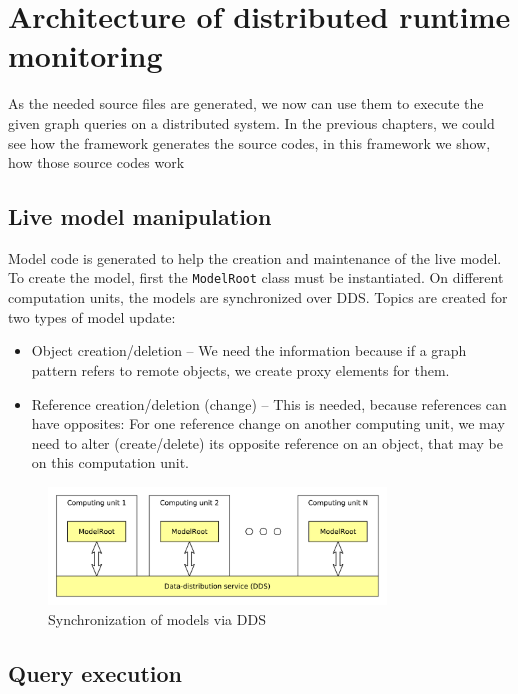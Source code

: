 %
\chapter{Architecture of distributed runtime monitoring}
%

As the needed source files are generated, we now can use them to execute the given graph queries on a distributed system. 
In the previous chapters, we could see how the framework generates the source codes, in this framework we show, how those source codes work



\section{Live model manipulation}
Model code is generated to help the creation and maintenance of the live model.
To create the model, first the \texttt{ModelRoot} class must be instantiated.
On different computation units, the models are synchronized over DDS.
Topics are created for two types of model update:
\begin{itemize}
	\item Object creation/deletion -- We need the information because if a graph pattern refers to remote objects, we create proxy elements for them.  
	\item Reference creation/deletion (change) -- This is needed, because references can have opposites: For one reference change on another computing unit, we may need to alter (create/delete) its opposite reference on an object, that may be on this computation unit.
\end{itemize}

\begin{figure}[H]
	\begin{center}
		\includegraphics[width=0.8\textwidth]{figures/model-dds.pdf}
		\caption{ Synchronization of models via DDS }
		\label{fig:model-dds}
	\end{center}
\end{figure}

\section{Query execution}

